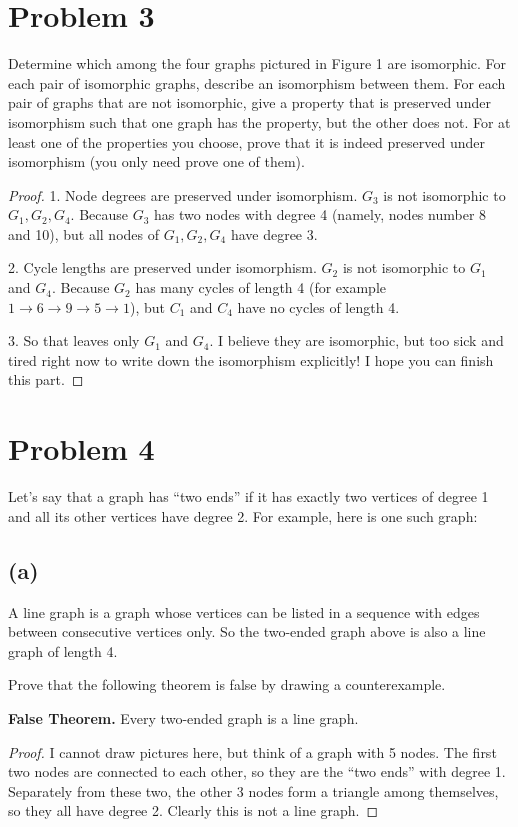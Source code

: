 \documentclass[14pt]{extarticle}
\begin{document}
\section{Problem 3}
Determine which among the four graphs pictured in Figure 1 are isomorphic. For each pair of isomorphic graphs, describe an isomorphism between them. For each pair of graphs that are not isomorphic, give a property that is preserved under isomorphism such that one graph has the property, but the other does not. For at least one of the properties you choose, prove that it is indeed preserved under isomorphism (you only need prove one of them).
\begin{proof}
1. Node degrees are preserved under isomorphism. $G_3$ is not isomorphic to $G_1, G_2, G_4$. Because $G_3$ has two nodes with degree 4 (namely, nodes number 8 and 10), but all nodes of $G_1, G_2, G_4$ have degree 3. 

2. Cycle lengths are preserved under isomorphism. $G_2$ is not isomorphic to $G_1$ and $G_4$. Because $G_2$ has many cycles of length 4 (for example $1 \rightarrow 6 \rightarrow 9 \rightarrow 5 \rightarrow 1$), but $C_1$ and $C_4$ have no cycles of length 4.

3. So that leaves only $G_1$ and $G_4$. I believe they are isomorphic, but too sick and tired right now to write down the isomorphism explicitly! I hope you can finish this part.
\end{proof}

\section{Problem 4}
Let’s say that a graph has “two ends” if it has exactly two vertices of degree 1 and all its other vertices have degree 2. For example, here is one such graph:

\subsection{(a)}
A line graph is a graph whose vertices can be listed in a sequence with edges between consecutive vertices only. So the two-ended graph above is also a line graph of length 4. 

Prove that the following theorem is false by drawing a counterexample.

{\bf False Theorem.} Every two-ended graph is a line graph.
\begin{proof}
I cannot draw pictures here, but think of a graph with 5 nodes. The first two nodes are connected to each other, so they are the ``two ends'' with degree 1. Separately from these two, the other 3 nodes form a triangle among themselves, so they all have degree 2. Clearly this is not a line graph.
\end{proof}
\end{document}
